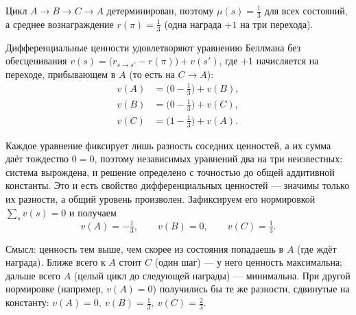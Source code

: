 \begin{solution}
    Цикл $A\to B\to C\to A$ детерминирован, поэтому $\mu(s)=\tfrac13$ для всех
    состояний, а среднее вознаграждение $r(\pi)=\tfrac13$ (одна награда $+1$ на
    три перехода).

    Дифференциальные ценности удовлетворяют уравнению Беллмана без обесценивания
    $v(s) = \big(r_{s\to s'}-r(\pi)\big)+v(s')$, где $+1$ начисляется на переходе,
    прибывающем в $A$ (то есть на $C\to A$):
    \begin{align*}
        v(A) &= \big(0-\tfrac13\big)+v(B),\\
        v(B) &= \big(0-\tfrac13\big)+v(C),\\
        v(C) &= \big(1-\tfrac13\big)+v(A).
    \end{align*}

    Каждое уравнение фиксирует лишь разность соседних ценностей, а их сумма даёт
    тождество $0=0$, поэтому независимых уравнений два на три неизвестных: система
    вырождена, и решение определено с точностью до общей аддитивной константы.
    Это и есть свойство дифференциальных ценностей --- значимы только их разности,
    а общий уровень произволен. Зафиксируем его нормировкой $\sum_s v(s)=0$ и
    получаем
    \begin{equation*}
        v(A) = -\tfrac13, \qquad v(B) = 0, \qquad v(C) = \tfrac13.
    \end{equation*}

    Смысл: ценность тем выше, чем скорее из состояния попадаешь в $A$ (где ждёт
    награда). Ближе всего к $A$ стоит $C$ (один шаг) --- у него ценность
    максимальна; дальше всего $A$ (целый цикл до следующей награды) --- минимальна.
    При другой нормировке (например, $v(A)=0$) получились бы те же разности,
    сдвинутые на константу: $v(A)=0,\ v(B)=\tfrac13,\ v(C)=\tfrac23$.
\end{solution}


